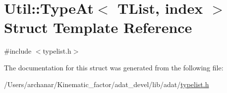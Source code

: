 \hypertarget{structUtil_1_1TL_1_1TypeAt}{}\section{Util\+:\+:Type\+At$<$ T\+List, index $>$ Struct Template Reference}
\label{structUtil_1_1TL_1_1TypeAt}


{\ttfamily \#include $<$typelist.\+h$>$}



The documentation for this struct was generated from the following file\+:\begin{DoxyCompactItemize}
\item 
/\+Users/archanar/\+Kinematic\+\_\+factor/adat\+\_\+devel/lib/adat/\mbox{\hyperlink{lib_2adat_2typelist_8h}{typelist.\+h}}\end{DoxyCompactItemize}
